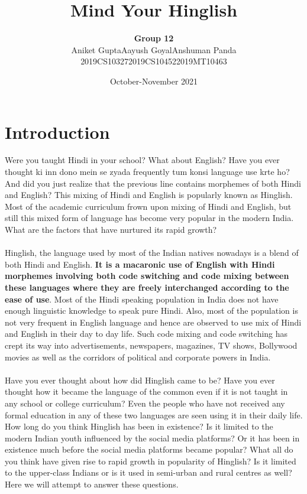 \documentclass{article}
\title{Mind Your Hinglish}
\author{\textbf{Group 12}\\\hspace{0.55cm}Aniket Gupta\hspace{2cm}Aayush Goyal\hspace{2cm}Anshuman Panda\\2019CS10327\hspace{2.2cm}2019CS10452\hspace{2.4cm}2019MT10463}
\date{October-November 2021}
\begin{document}
\maketitle

{
  \hypersetup{linkcolor=blue}
  \tableofcontents
}

\newpage
\section{Introduction}
Were you taught Hindi in your school? What about English? Have you ever thought ki inn dono mein se zyada frequently tum konsi language use krte ho? And did you just realize that the previous line contains morphemes of both Hindi and English? This mixing of Hindi and English is popularly known as Hinglish. Most of the academic curriculum frown upon mixing of Hindi and English, but still this mixed form of language has become very popular in the modern India. What are the factors that have nurtured its rapid growth?
\\\\
Hinglish, the language used by most of the Indian natives nowadays is a blend of both Hindi and English. \textbf{It is a macaronic use of English with Hindi morphemes involving both code switching and code mixing between these languages where they are freely interchanged according to the ease of use}. Most of the Hindi speaking population in India does not have enough linguistic knowledge to speak pure Hindi. Also, most of the population is not very frequent in English language and hence are observed to use mix of Hindi and English in their day to day life. Such code mixing and code switching has crept its way into advertisements, newspapers, magazines, TV shows, Bollywood movies as well as the corridors of political and corporate powers in India.
\\\\
Have you ever thought about how did Hinglish came to be? Have you ever thought how it became the language of the common even if it is not taught in any school or college curriculum? Even the people who have not received any formal education in any of these two languages are seen using it in their daily life. How long do you think Hinglish has been in existence? Is it limited to the modern Indian youth influenced by the social media platforms? Or it has been in existence much before the social media platforms became popular? What all do you think have given rise to rapid growth in popularity of Hinglish? Is it limited to the upper-class Indians or is it used in semi-urban and rural centres as well? Here we will attempt to answer these questions.
\end{document}
